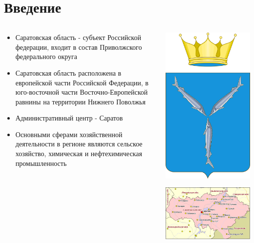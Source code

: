 
\section{Введение}
\begin{frame}{\insertsectionhead}

\begin{columns}[onlytextwidth,T]
  \begin{column}{.55\linewidth}
    \footnotesize
    \begin{itemize}
        \item Саратовская область - субъект Российской федерации, входит в состав Приволжского федерального округа
        \item Саратовская область расположена в европейской части Российской Федерации, в юго-восточной части 
        Восточно-Европейской равнины на территории Нижнего Поволжья
        \item Административный центр - Саратов
        \item Основными сферами хозяйственной деятельности в регионе являются сельское хозяйство, химическая и нефтехимическая промышленность
    \end{itemize}
  \end{column}

  \begin{column}{.43\linewidth}
    \begin{center}
        \includegraphics[width=.2\textwidth]{assets/logo.png}
    \end{center}
    \includegraphics[width=\textwidth]{assets/saratov.png}
  \end{column}

\end{columns}
\end{frame}

